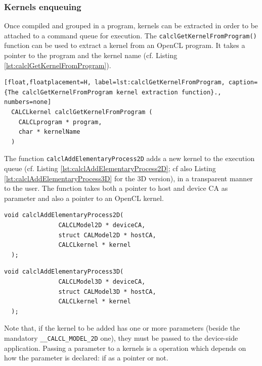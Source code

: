\subsubsection{Kernels enqueuing}

Once compiled and grouped in a program, kernels can be
extracted in order to be attached to a command queue for
execution. The \verb'calclGetKernelFromProgram()' function can be used
to extract a kernel from an OpenCL program. It takes a pointer to the
program and the kernel name (cf. Listing
\ref{lst:calclGetKernelFromProgram}).

\begin{lstlisting}[float,floatplacement=H, label=lst:calclGetKernelFromProgram, caption={The calclGetKernelFromProgram kernel extraction function}., numbers=none]
  CALCLkernel calclGetKernelFromProgram (
    CALCLprogram * program,
    char * kernelName
  )
\end{lstlisting}

The function \verb'calclAddElementaryProcess2D' adds a new kernel to
the execution queue (cf. Listing
\ref{lst:calclAddElementaryProcess2D}; cf also Listing
\ref{lst:calclAddElementaryProcess3D} for the 3D version), in a
transparent manner to the user. The function takes both a pointer to
host and device CA as parameter and also a pointer to an OpenCL
kernel.

\begin{lstlisting}[float,floatplacement=TH, label=lst:calclAddElementaryProcess2D, caption=The calclAddElementaryProcess2D() function., numbers=none]
  void calclAddElementaryProcess2D(
               CALCLModel2D * deviceCA,
               struct CALModel2D * hostCA,
               CALCLkernel * kernel
  );
\end{lstlisting}

\begin{lstlisting}[float,floatplacement=TH, label=lst:calclAddElementaryProcess3D, caption=The calclAddElementaryProcess3D() function., numbers=none]
  void calclAddElementaryProcess3D(
               CALCLModel3D * deviceCA,
               struct CALModel3D * hostCA,
               CALCLkernel * kernel
  );
\end{lstlisting}

Note that, if the kernel to be added has one or more parameters
(beside the mandatory \verb'__CALCL_MODEL_2D' one), they must be
passed to the device-side application. Passing a parameter to a
kernels is a operation which depends on how the parameter is declared:
if as a pointer or not.

